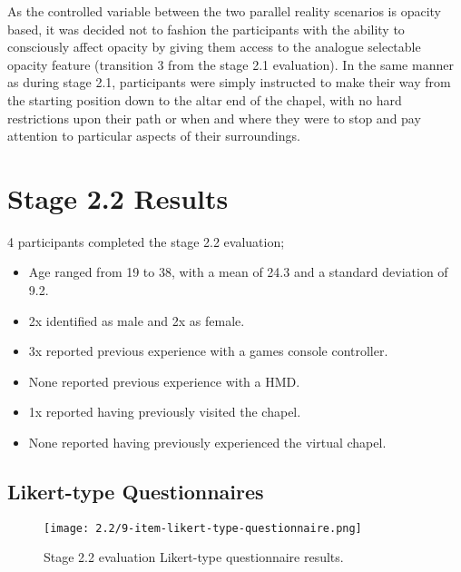 As the controlled variable between the two parallel reality scenarios is opacity based, it was decided not to fashion the participants with the ability to consciously affect opacity by giving them access to the analogue selectable opacity feature (transition 3 from the stage 2.1 evaluation). In the same manner as during stage 2.1, participants were simply instructed to make their way from the starting position down to the altar end of the chapel, with no hard restrictions upon their path or when and where they were to stop and pay attention to particular aspects of their surroundings.


\section{Stage 2.2 Results}

4 participants completed the stage 2.2 evaluation;
\begin{itemize}
	\item Age ranged from 19 to 38, with a mean of 24.3 and a standard deviation of 9.2.
	\item 2x identified as male and 2x as female.
	\item 3x reported previous experience with a games console controller.
	\item None reported previous experience with a HMD.
	\item 1x reported having previously visited the chapel.
	\item None reported having previously experienced the virtual chapel.
\end{itemize}


\subsection{Likert-type Questionnaires}

\begin{figure}[h]
	\begin{center}
	\texttt{[image: 2.2/9-item-likert-type-questionnaire.png]}
	\caption{Stage 2.2 evaluation Likert-type questionnaire results.}
	\label{9-item-likert-type-questionnaire.png}
	\end{center}
\end{figure}

